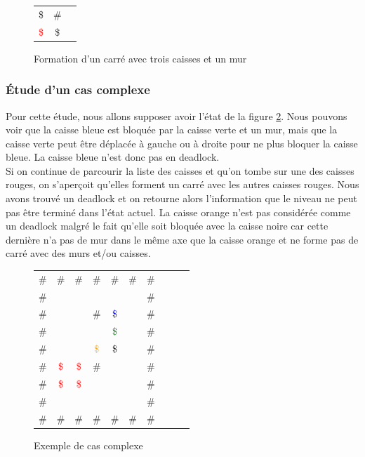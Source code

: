 \documentclass[a4paper,12pt]{article} %
\begin{document}
\begin{figure}[!h]
\centering
\begin{tabular}{ l c r }
\$                  & \# \\
\textcolor{red}{\$} & \$ \\
\end{tabular}
\caption{Formation d'un carré avec trois caisses et un mur}
\label{DLcarreMur}
\end{figure}

\subsubsection{Étude d'un cas complexe}

Pour cette étude, nous allons supposer avoir l'état de la figure \ref{DLCompl}. Nous pouvons voir que la caisse bleue est bloquée par la caisse verte et un mur, mais que la caisse verte peut être déplacée à gauche ou à droite pour ne plus bloquer la caisse bleue. La caisse bleue n'est donc pas en deadlock.\\
Si on continue de parcourir la liste des caisses et qu'on tombe sur une des caisses rouges, on s'aperçoit qu'elles forment un carré avec les autres caisses rouges. Nous avons trouvé un deadlock et on retourne alors l'information que le niveau ne peut pas être terminé dans l'état actuel. La caisse orange n'est pas considérée comme un deadlock malgré le fait qu'elle soit bloquée avec la caisse noire car cette dernière n'a pas de mur dans le même axe que la caisse orange et ne forme pas de carré avec des murs et/ou caisses.

\begin{figure}[!h]
\centering
\begin{tabular}{ l*{4} c*{5} r }
\# & \# & \# & \# & \# & \# & \#\\
\# & \ & \ & \ & \ & \ & \#\\
\# & \  & \  & \# & \textcolor{blue}{\$} & \ & \#\\
\# & \  & \  & \  & \textcolor{green}{\$} & \ & \#\\
\# & \  & \  & \textcolor{orange}{\$} & \$ & \ & \#\\
\# & \textcolor{red}{\$} & \textcolor{red}{\$} & \# & \ & \ & \#\\
\# & \textcolor{red}{\$} & \textcolor{red}{\$} & \  & \ & \ & \#\\
\# & \ & \ & \ & \ & \ & \#\\
\# & \# & \# & \# & \# & \# & \#\\
\end{tabular}
\caption{Exemple de cas complexe}
\label{DLCompl}
\end{figure}
\end{document}
